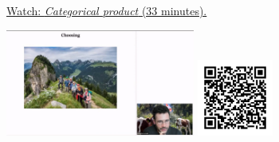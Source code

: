 
\begin{minipage}{10cm}
    \href{https://act4e-spring21.netlify.app/videos/spring2021-products:products:cat-prod.html}{Watch: \emph{Categorical product} (33 minutes).}
        
    \href{https://act4e-spring21.netlify.app/videos/spring2021-products:products:cat-prod.html}{\includegraphics[height=3.5cm]{spring2021-products:products:cat-prod/thumbnails.jpg}}
    \href{https://act4e-spring21.netlify.app/videos/spring2021-products:products:cat-prod.html}{\includegraphics[height=2.5cm]{spring2021-products:products:cat-prod/qrcode.png}}
\end{minipage}
